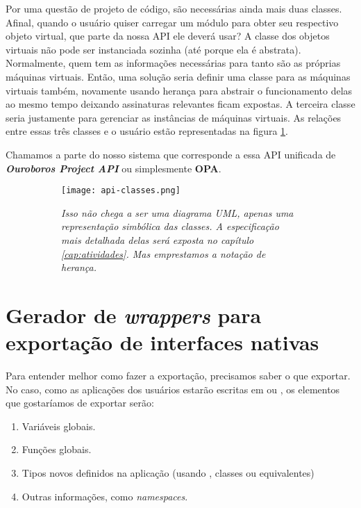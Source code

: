     Por uma questão de projeto de código, são necessárias ainda mais duas
    classes. Afinal, quando o usuário quiser carregar um módulo para obter seu
    respectivo objeto virtual, que parte da nossa API ele deverá usar? A classe
    dos objetos virtuais não pode ser instanciada sozinha (até porque ela é
    abstrata). Normalmente, quem tem as informações necessárias para tanto são
    as próprias máquinas virtuais. Então, uma solução seria definir uma classe
    para as máquinas virtuais também, novamente usando herança para abstrair o
    funcionamento delas ao mesmo tempo deixando assinaturas relevantes ficam
    expostas. A terceira classe seria justamente para gerenciar as instâncias de
    máquinas virtuais. As relações entre essas três classes e o usuário estão
    representadas na figura \ref{fig:api-classes}.

    Chamamos a parte do nosso sistema que corresponde a essa API unificada de
    \emph{\textbf{Ouroboros Project API}} ou simplesmente \textbf{OPA}.

    \begin{figure}[ht]
      \centering
      \caption{}
      \begin{subfigure}{.8\textwidth}
        \begin{center}
          \texttt{[image: api-classes.png]}
          \vspace{1em}

          \textit{
            Isso não chega a ser uma diagrama UML, apenas uma representação
            simbólica das classes. A especificação mais detalhada delas será
            exposta no capítulo \ref{cap:atividades}. Mas emprestamos a notação
            de herança.
          }
        \end{center}
      \end{subfigure}
      \label{fig:api-classes}
    \end{figure}
  
  \section{Gerador de \textit{wrappers} para exportação de interfaces nativas}
  \label{cap:estrutura:opwig}

    Para entender melhor como fazer a exportação, precisamos saber o que
    exportar. No caso, como as aplicações dos usuários estarão escritas em \C{}
    ou \CXX{}, os elementos que gostaríamos de exportar serão:

    \begin{enumerate}
      \item Variáveis globais.
      \item Funções globais.
      \item Tipos novos definidos na aplicação (usando , classes
            ou equivalentes)
      \item Outras informações, como \textit{namespaces}.
    \end{enumerate}

